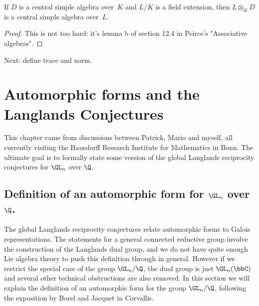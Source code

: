 \begin{lemma}
    \label{IsCentralSimple.baseChange} %
    If $D$ is a central simple algebra over~$K$ and $L/K$ is a field extension, then $L\otimes_KD$
    is a central simple algebra over~$L$.
\end{lemma}
\begin{proof}
    This is not too hard: it's lemma b of section 12.4 in Peirce's "Associative algebras".
\end{proof}


Next: define trace and norm.




\chapter{Automorphic forms and the Langlands Conjectures}

This chapter came from discussions between Patrick, Mario and myself, all currently
visiting the Hausdorff Research Institute for
Mathematics in Bonn. The ultimate goal is to formally state some version of the global Langlands
reciprocity conjectures for $\GL_n$ over $\Q$.

\section[Definition of an automorphic form]{Definition of an automorphic form for $\GL_n$ over $\Q$.}

The global Langlands reciprocity conjectures relate automorphic forms to Galois representations.
The statements for a general connected reductive group involve the construction of the Langlands
dual group, and we do not have quite enough Lie algebra theory to push this definition through
in general. However if we restrict the special case of the group $\GL_n/\Q$, the dual group
is just $\GL_n(\bbC)$ and several other technical obstructions are also removed. In this
section we will explain the definition of an automorphic form for the group $\GL_n/\Q$, following
the exposition by Borel and Jacquet in Corvallis.

